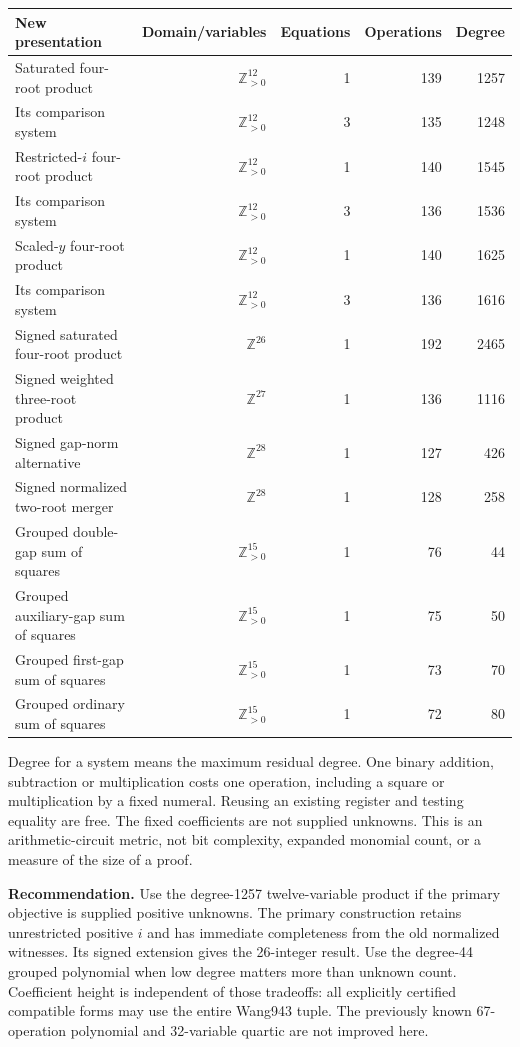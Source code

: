 \documentclass[11pt]{article}
\newcommand{\Z}{\mathbb Z}
\newcommand{\Pos}{\mathbb Z_{>0}}
\begin{document}
\begin{center}
\small
\begin{tabular}{@{}lrrrr@{}}
\toprule
New presentation & Domain/variables & Equations & Operations & Degree\\
\midrule
Saturated four-root product & $\Pos^{12}$ & 1 & 139 & 1257\\
Its comparison system & $\Pos^{12}$ & 3 & 135 & 1248\\
Restricted-$i$ four-root product & $\Pos^{12}$ & 1 & 140 & 1545\\
Its comparison system & $\Pos^{12}$ & 3 & 136 & 1536\\
Scaled-$y$ four-root product & $\Pos^{12}$ & 1 & 140 & 1625\\
Its comparison system & $\Pos^{12}$ & 3 & 136 & 1616\\
Signed saturated four-root product & $\Z^{26}$ & 1 & 192 & 2465\\
Signed weighted three-root product & $\Z^{27}$ & 1 & 136 & 1116\\
Signed gap-norm alternative & $\Z^{28}$ & 1 & 127 & 426\\
Signed normalized two-root merger & $\Z^{28}$ & 1 & 128 & 258\\
Grouped double-gap sum of squares & $\Pos^{15}$ & 1 & 76 & 44\\
Grouped auxiliary-gap sum of squares & $\Pos^{15}$ & 1 & 75 & 50\\
Grouped first-gap sum of squares & $\Pos^{15}$ & 1 & 73 & 70\\
Grouped ordinary sum of squares & $\Pos^{15}$ & 1 & 72 & 80\\
\bottomrule
\end{tabular}
\end{center}
Degree for a system means the maximum residual degree. One binary addition, subtraction or multiplication costs one operation, including a square or multiplication by a fixed numeral. Reusing an existing register and testing equality are free. The fixed coefficients are not supplied unknowns. This is an arithmetic-circuit metric, not bit complexity, expanded monomial count, or a measure of the size of a proof.

\textbf{Recommendation.} Use the degree-1257 twelve-variable product if the primary objective is supplied positive unknowns. The primary construction retains unrestricted positive $i$ and has immediate completeness from the old normalized witnesses. Its signed extension gives the 26-integer result. Use the degree-44 grouped polynomial when low degree matters more than unknown count. Coefficient height is independent of those tradeoffs: all explicitly certified compatible forms may use the entire Wang943 tuple. The previously known 67-operation polynomial and 32-variable quartic are not improved here.
\end{document}
